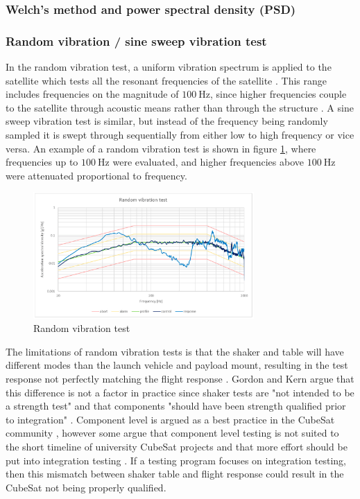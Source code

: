 \documentclass[a4paper,11pt]{article}
\begin{document}
\subsubsection{Welch's method and power spectral density (PSD)}


\subsubsection{Random vibration / sine sweep vibration test}
In the random vibration test, a uniform vibration spectrum is applied to the satellite which tests all the resonant frequencies of the satellite \cite{nieto2019cubesat}. This range includes frequencies on the magnitude of $\SI{100}{\hertz}$, since higher frequencies couple to the satellite through acoustic means rather than through the structure \cite{gordon2015benefits}. A sine sweep vibration test is similar, but instead of the frequency being randomly sampled it is swept through sequentially from either low to high frequency or vice versa. An example of a random vibration test is shown in figure \ref{fig:random}, where frequencies up to $\SI{100}{\hertz}$ were evaluated, and higher frequencies above $\SI{100}{\hertz}$ were attenuated proportional to frequency.

\begin{figure}[H]
  \centering
  \includegraphics[width=0.75\textwidth]{images/random-study.png}
  \caption{Random vibration test \cite{nieto2019cubesat}}
  \label{fig:random}
\end{figure}

The limitations of random vibration tests is that the shaker and table will have different modes than the launch vehicle and payload mount, resulting in the test response not perfectly matching the flight response \cite{gordon2015benefits,aglietti2019spacecraft}. Gordon and Kern argue that this difference is not a factor in practice since shaker tests are "not intended to be a strength test"  \cite[p.~7]{gordon2015benefits} and that components "should have been strength qualified prior to integration" \cite[p.~7]{gordon2015benefits}. Component level is argued as a best practice in the CubeSat community \cite{rawsonbest}, however some argue that component level testing is not suited to the short timeline of university CubeSat projects and that more effort should be put into integration testing \cite{decker2016systems}. If a testing program focuses on integration testing, then this mismatch between shaker table and flight response could result in the CubeSat not being properly qualified.
\end{document}

